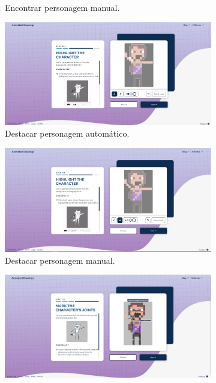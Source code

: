 \begin{figure}[htbp]
\begin{subfigure}{0.45\linewidth}
        \caption{\small Encontrar personagem manual.}
        \label{fig:sketch2c}
    \end{subfigure}
    \begin{subfigure}{0.45\linewidth}
        \centering
        \includegraphics[width=1\linewidth]{figs/sketchLab/2tela4.PNG}
        \caption{\small Destacar personagem automático.}
        \label{fig:sketch2d}
    \end{subfigure}
    \begin{subfigure}{0.45\linewidth}
        \centering
        \includegraphics[width=1\linewidth]{figs/sketchLab/2tela5.PNG}
        \caption{\small Destacar personagem manual.}
        \label{fig:sketch2e}
    \end{subfigure}
    \begin{subfigure}{0.45\linewidth}
        \centering
        \includegraphics[width=1\linewidth]{figs/sketchLab/2tela6_2.PNG}

\end{subfigure}
\end{figure}
